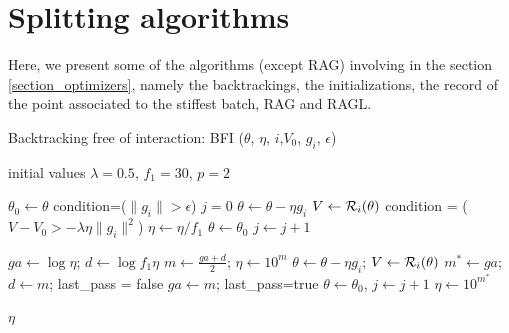 \section{Splitting algorithms}
\label{annexe_algo}

Here, we present some of the algorithms (except RAG) involving in the section \ref{section_optimizers}, namely the backtrackings, the initializations, the record of the point associated to the stiffest batch, RAG and RAGL. 

\begin{algorithm}[h!]
	\caption{Backtracking free of interaction: BFI ($\theta$, $\eta$, $i$,$V_0$, $g_i$, $\epsilon$)}
	\label{linesearch_batch1}
	\begin{algorithmic}
		\REQUIRE initial values $\lambda=0.5$, $f_1=30$, $p=2$ 
		
		\STATE $\theta_0 \leftarrow \theta$
		\STATE condition=($\|g_i\|>\epsilon$)
		\STATE $j=0$
		\STATE $\theta \leftarrow \theta-\eta g_i$
		\STATE $V \leftarrow \mathcal{R}_i(\theta)$
		\STATE condition = ($V-V_0>-\lambda \eta \|g_i\|^2$)
		\STATE $\eta \leftarrow \eta/f_1$
		\ENDIF
		\STATE $\theta \leftarrow \theta_0$
		\STATE $j \leftarrow j+1$
		\ENDWHILE
		
		\STATE $ga \leftarrow \log{\eta}$; $d \leftarrow \log{f_1\eta}$
		\STATE $m \leftarrow \frac{ga+d}{2}$; $\eta \leftarrow 10^m$
		\STATE $\theta \leftarrow \theta - \eta g_i$; $V \leftarrow \mathcal{R}_i(\theta)$
		\STATE $m^* \leftarrow ga$; $d \leftarrow m$; last\_pass = false
		\ELSE
		\STATE $ga \leftarrow m$; last\_pass=true
		\ENDIF
		\STATE $\theta \leftarrow \theta_0$, $j\leftarrow j+1$
		\ENDFOR
		\STATE $\eta \leftarrow 10^{m^*}$
		\ENDIF
		\ENDIF
		
		\RETURN $\eta$
	\end{algorithmic}
\end{algorithm} 

